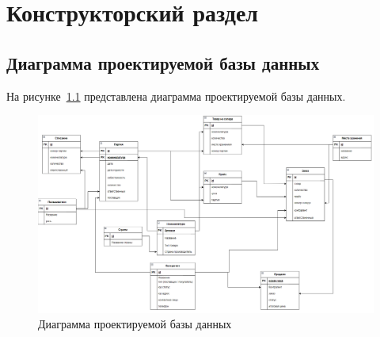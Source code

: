 \chapter{Конструкторский раздел}
\section{Диаграмма проектируемой базы данных}
На рисунке~\ref{fig:BD} представлена диаграмма  проектируемой базы данных.

\begin{figure}
	\centering
	\includegraphics[width=1.5\linewidth, angle=-90]{pictures/BD}
	\caption{Диаграмма проектируемой базы данных}
	\label{fig:BD}
\end{figure}

